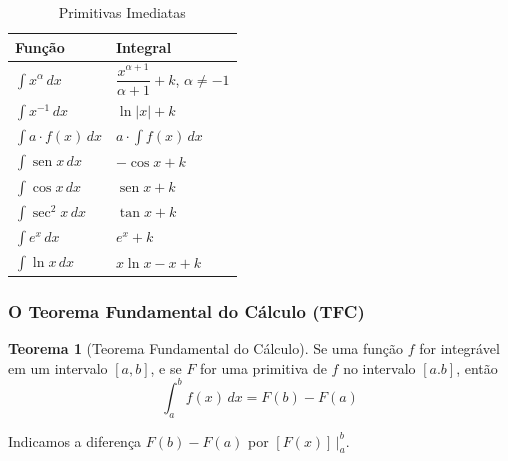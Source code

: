 \documentclass[12pt,openright,twoside,a4paper]{article}
\theoremstyle{definition}
\newtheorem{theorem}{Teorema}[section]
\renewcommand{\sin}{\operatorname{sen}} %
\begin{document}
		\begin{table}[h!]
			\centering
			\caption{Primitivas Imediatas}
			\begin{tabular}{|>{\centering\arraybackslash}m{6cm}|>{\centering\arraybackslash}m{8cm}|}
				\hline
				\textbf{Função} & \textbf{Integral} \\
				\hline
				$\displaystyle \int x^\alpha \, dx$ & $\displaystyle \dfrac{x^{\alpha + 1}}{\alpha + 1} + k$, $\alpha \neq -1$ \\
				\hline
				$\displaystyle \int x^{-1} \, dx$ & $\displaystyle \ln|x| + k$ \\
				\hline
				$\displaystyle \int a \cdot f(x) \, dx$ & $\displaystyle a \cdot \int f(x) \, dx$ \\
				\hline
				$\displaystyle \int \sin x \, dx$ & $-\cos x + k$ \\
				\hline
				$\displaystyle \int \cos x \, dx$ & $\sin x + k$ \\
				\hline
				$\displaystyle \int \sec^2 x \, dx$ & $\tan x + k$ \\
				\hline
				$\displaystyle \int e^x \, dx$ & $e^x + k$ \\
				\hline
				$\displaystyle \int \ln x \, dx$ & $x \ln x - x + k$ \\
				\hline
			\end{tabular}
			\label{tab:primitivas_imediatas}
		\end{table}
		\renewcommand{\arraystretch}{1.0}
	
	\subsubsection{O Teorema Fundamental do Cálculo (TFC)}
	
	\begin{theorem}[Teorema Fundamental do Cálculo]
		Se uma função $f$ for integrável em um intervalo $[a,b]$, e se $F$ for uma primitiva de $f$ no intervalo $[a.b]$, então
		\begin{equation}
			\boxed{\int_a^b f(x) \,dx = F(b) - F(a)}
		\end{equation}
		
		Indicamos a diferença $F(b) - F(a)$ por $[F(x)]\,|_a^b$.
	\end{theorem}
	
\end{document}
